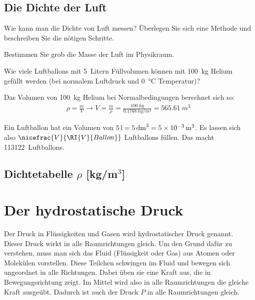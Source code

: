 \documentclass[12pt,a4paper,twoside]{article}
\begin{document}
\subsection*{Die Dichte der Luft}
\begin{aufgabe}
	Wie kann man die Dichte von Luft messen?
	Überlegen Sie sich eine Methode und beschreiben Sie die nötigen Schritte.
\end{aufgabe}

\begin{aufgabe}
	Bestimmen Sie grob die Masse der Luft im Physikraum. 
\end{aufgabe}


\begin{aufgabe}
	Wie viele Luftballons mit \SI{5}{Litern} Füllvolumen können mit \SI{100}{kg} Helium gefüllt werden
	(bei normalem Luftdruck und \SI{0}{\celsius} Temperatur)?

	\begin{loesung}
		Das Volumen von \SI{100}{kg} Helium bei Normalbedingungen berechnet sich so:
		\begin{eqnarray*}
			\rho=\frac{m}{V}\to V=\frac{m}{\rho}=\frac{\SI{100}{kg}}{\SI{0.1768}{kg/m^3}}=\SI{565.61}{m^3}
		\end{eqnarray*}

		Ein Luftballon hat ein Volumen von $\SI{5}{l} = \SI{5}{dm^3} = \SI{5E-3}{m^3}$.
		Es lassen sich also $\nicefrac{V}{\RI{V}{Ballon}}$ Luftballons füllen.
		Das macht \SI{113122} Luftballons.

	\end{loesung}

\end{aufgabe}

\newpage
\subsection*{Dichtetabelle $\rho$ [kg/m$^3$]}
	

\newpage



\section*{Der hydrostatische Druck}
Der Druck in Flüssigkeiten und Gasen wird hydrostatischer Druck genannt.
Dieser Druck wirkt in alle Raumrichtungen gleich. Um den Grund dafür zu verstehen,
muss man sich das Fluid (Flüssigkeit oder Gas) aus Atomen oder Molekülen vorstellen.
Diese Teilchen schwingen im Fluid und bewegen sich ungeordnet in alle Richtungen.
Dabei üben sie eine Kraft aus, die in Bewegungsrichtung zeigt. Im Mittel wird also
in alle Raumrichtungen die gleiche Kraft ausgeübt. Dadurch ist auch der Druck $P$ in alle
Raumrichtungen gleich.
\end{document}
